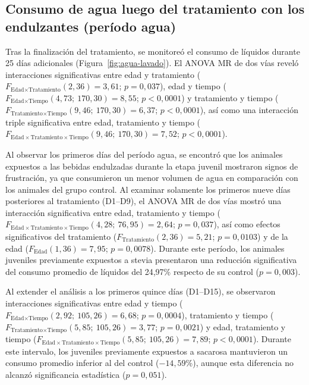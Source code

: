 \subsection{Consumo de agua luego del tratamiento con los endulzantes (período agua)}\label{sec:res-consumo-lavado}

Tras la finalización del tratamiento, se monitoreó el consumo de líquidos durante 25 días adicionales (Figura~\ref{fig:agua-lavado}). El ANOVA MR de dos vías reveló interacciones significativas entre edad y tratamiento ($F_{\text{Edad} \times \text{Tratamiento}}(2, 36) = 3{,}61$; $p = 0{,}037$), edad y tiempo ($F_{\text{Edad} \times \text{Tiempo}}(4{,}73;\ 170{,}30) = 8{,}55$; $p < 0{,}0001$) y tratamiento y tiempo ($F_{\text{Tratamiento} \times \text{Tiempo}}(9{,}46;\ 170{,}30) = 6{,}37$; $p < 0{,}0001$), así como una interacción triple significativa entre edad, tratamiento y tiempo ($F_{\text{Edad} \times \text{Tratamiento} \times \text{Tiempo}}(9{,}46;\ 170{,}30) = 7{,}52$; $p < 0{,}0001$).

Al observar los primeros días del período agua, se encontró que los animales expuestos a las bebidas endulzadas durante la etapa juvenil mostraron signos de frustración, ya que consumieron un menor volumen de agua en comparación con los animales del grupo control. Al examinar solamente los primeros nueve días posteriores al tratamiento (D1--D9), el ANOVA MR de dos vías mostró una interacción significativa entre edad, tratamiento y tiempo ($F_{\text{Edad} \times \text{Tratamiento} \times \text{Tiempo}}(4{,}28;\ 76{,}95) = 2{,}64$; $p = 0{,}037$), así como efectos significativos del tratamiento ($F_{\text{Tratamiento}}(2, 36) = 5{,}21$; $p = 0{,}0103$) y de la edad ($F_{\text{Edad}}(1, 36) = 7{,}95$; $p = 0{,}0078$). Durante este período, los animales juveniles previamente expuestos a stevia presentaron una reducción significativa del consumo promedio de líquidos del 24,97\% respecto de su control ($p = 0{,}003$).

Al extender el análisis a los primeros quince días (D1--D15), se observaron interacciones significativas entre edad y tiempo ($F_{\text{Edad} \times \text{Tiempo}}(2{,}92;\ 105{,}26) = 6{,}68$; $p = 0{,}0004$), tratamiento y tiempo ($F_{\text{Tratamiento} \times \text{Tiempo}}(5{,}85;\ 105{,}26) = 3{,}77$; $p = 0{,}0021$) y edad, tratamiento y tiempo ($F_{\text{Edad} \times \text{Tratamiento} \times \text{Tiempo}}(5{,}85;\ 105{,}26) = 7{,}89$; $p < 0{,}0001$). Durante este intervalo, los juveniles previamente expuestos a sacarosa mantuvieron un consumo promedio inferior al del control ($-14{,}59$\%), aunque esta diferencia no alcanzó significancia estadística ($p = 0{,}051$).

